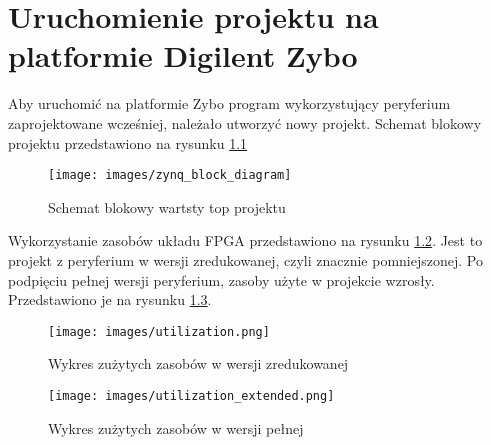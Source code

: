 \chapter{Uruchomienie projektu na platformie Digilent Zybo}

Aby uruchomić na platformie Zybo program  wykorzystujący peryferium zaprojektowane wcześniej, należało utworzyć nowy projekt.
Schemat blokowy projektu przedstawiono na rysunku \ref{design_block_diagram}

\begin{figure}[H]
	\centering
	\texttt{[image: images/zynq\_block\_diagram]}
	\caption{Schemat blokowy wartsty top projektu}
	\label{design_block_diagram}
\end{figure} 

Wykorzystanie zasobów układu FPGA przedstawiono na rysunku \ref{utilization_plot}. Jest to projekt z peryferium w wersji zredukowanej, czyli znacznie pomniejszonej. Po podpięciu pełnej wersji peryferium, zasoby użyte w projekcie wzrosły. Przedstawiono je na rysunku \ref{utilization_plot_extended}.

\begin{figure}[H]
	\centering
	\texttt{[image: images/utilization.png]}
	\caption{Wykres zużytych zasobów w wersji zredukowanej}
	\label{utilization_plot}
\end{figure} 

\begin{figure}[H]
	\centering
	\texttt{[image: images/utilization\_extended.png]}
	\caption{Wykres zużytych zasobów w wersji pełnej}
	\label{utilization_plot_extended}
\end{figure} 



